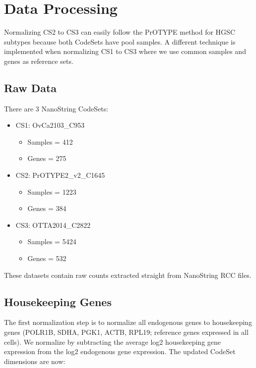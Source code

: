 \documentclass[
]{report}
\providecommand{\tightlist}{%
  \setlength{\itemsep}{0pt}\setlength{\parskip}{0pt}}
\begin{document}
\hypertarget{data-processing}{%
\section{Data Processing}\label{data-processing}}

Normalizing CS2 to CS3 can easily follow the PrOTYPE method for HGSC subtypes because both CodeSets have pool samples. A different technique is implemented when normalizing CS1 to CS3 where we use common samples and genes as reference sets.

\hypertarget{raw-data}{%
\subsection{Raw Data}\label{raw-data}}

There are 3 NanoString CodeSets:

\begin{itemize}
\tightlist
\item
  CS1: OvCa2103\_C953

  \begin{itemize}
  \tightlist
  \item
    Samples = 412
  \item
    Genes = 275
  \end{itemize}
\item
  CS2: PrOTYPE2\_v2\_C1645

  \begin{itemize}
  \tightlist
  \item
    Samples = 1223
  \item
    Genes = 384
  \end{itemize}
\item
  CS3: OTTA2014\_C2822

  \begin{itemize}
  \tightlist
  \item
    Samples = 5424
  \item
    Genes = 532
  \end{itemize}
\end{itemize}

These datasets contain raw counts extracted straight from NanoString RCC files.

\hypertarget{housekeeping-genes}{%
\subsection{Housekeeping Genes}\label{housekeeping-genes}}

The first normalization step is to normalize all endogenous genes to housekeeping genes (POLR1B, SDHA, PGK1, ACTB, RPL19; reference genes expressed in all cells). We normalize by subtracting the average log2 housekeeping gene expression from the log2 endogenous gene expression. The updated CodeSet dimensions are now:
\end{document}

